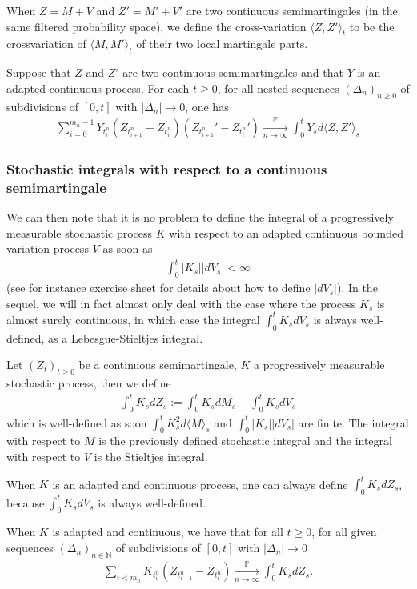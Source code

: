 \documentclass[../mainfile.tex]{subfiles}
\begin{document}
\newpage
\begin{defn} When $Z=M+V$ and $Z'=M'+V'$ are two continuous semimartingales (in the same filtered probability space), we define the cross-variation $\langle Z,  Z' \rangle_t$ to be the crossvariation of $\langle M, M' \rangle_t$ of their two local martingale parts.
\end{defn}
\begin{cor}\label{cor1} Suppose that $Z$ and $Z'$ are two continuous semimartingales and that $Y$ is an adapted continuous process. For each $t \geq 0$, for all nested sequences $(\Delta_n)_{n \geq 0}$ of subdivisions of $[0,t]$ with $|\Delta_n| \to 0$,  one has 
\begin{align*}
\sum_{i=0}^{m_n-1} Y_{t_i^n} (Z_{t_{i+1}^n}-Z_{t_i^n})(Z_{t_{i+1}^n}'-Z_{t_i^n}') \xrightarrow[n \to \infty]{ \mathbb{P}} \int_0^t Y_s d \langle Z, Z' \rangle_s
\end{align*}
\end{cor}
\subsubsection{Stochastic integrals with respect to a continuous semimartingale}
We can then note that it is no problem to define the integral of a progressively measurable stochastic process $K$ with respect to an adapted continuous bounded variation process $V$ as soon as  
\begin{align*}
\int_0^t |K_s| |dV_s| < \infty
\end{align*}
(see for instance exercise sheet for details about how to define $|dV_s|$). In the sequel, we will in fact almost only deal with the case where the process $K_s$ is almost surely continuous, in which case the integral $\int_0^t K_s d V_s$ is always well-defined, as a Lebesgue-Stieltjes integral. 
\begin{defn} Let $(Z_t)_{t \geq 0}$ be a continuous semimartingale, $K$ a progressively measurable stochastic process, then we define
\begin{align*}
\int_0^t K_s dZ_s := \int_0^t K_s dM_s + \int_0^t K_s dV_s
\end{align*}
which is well-defined as soon $\int_0^t K_s^2 d \langle M \rangle_s$ and $\int_0^t |K_s| |dV_s|$ are finite. The integral with respect to $M$ is the previously defined stochastic integral and the integral with respect to $V$ is the Stieltjes integral. 
\end{defn}
\begin{rem} When $K$ is an adapted and continuous process, one can always define $\int_0^t K_s dZ_s$, because $\int_0^t K_s dV_s$ is always well-defined. 
\end{rem}
\begin{lem}\label{lem2} When $K$ is adapted and continuous, we have that for all $t \geq 0$, for all given sequences $(\Delta_n)_{n \in \mathbb{N}}$ of subdivisions of $[0,t]$ with $|\Delta_n| \to 0$ \begin{align*}
\sum_{i < m_n} K_{t_i^n}(Z_{t_{i+1}^n}-Z_{t_i^n}) \xrightarrow[n \to \infty]{\mathbb{P}} \int_0^t K_sdZ_s.
\end{align*}
\end{lem}
\newpage
\end{document}

